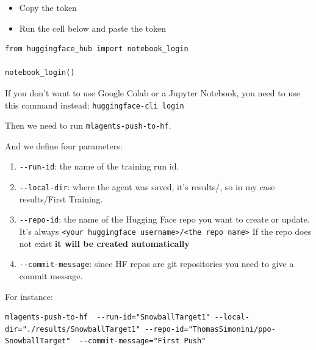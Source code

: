 \documentclass[11pt,a4paper]{article}
\begin{document}

\begin{itemize}
\tightlist
\item
  Copy the token
\item
  Run the cell below and paste the token
\end{itemize}

\begin{lstlisting}
from huggingface_hub import notebook_login

notebook_login()
\end{lstlisting}

If you don't want to use Google Colab or a Jupyter Notebook, you need to use this command instead: \texttt{huggingface-cli\ login}

Then we need to run \texttt{mlagents-push-to-hf}.

And we define four parameters:

\begin{enumerate}
\def\labelenumi{\arabic{enumi}.}
\item
  \texttt{-\/-run-id}: the name of the training run id.
\item
  \texttt{-\/-local-dir}: where the agent was saved, it's results/, so in my case results/First Training.
\item
  \texttt{-\/-repo-id}: the name of the Hugging Face repo you want to create or update. It's always \texttt{\textless{}your\ huggingface\ username\textgreater{}/\textless{}the\ repo\ name\textgreater{}} If the repo does not exist \textbf{it will be created automatically}
\item
  \texttt{-\/-commit-message}: since HF repos are git repositories you need to give a commit message.
\end{enumerate}


For instance:

\begin{lstlisting}
mlagents-push-to-hf  --run-id="SnowballTarget1" --local-dir="./results/SnowballTarget1" --repo-id="ThomasSimonini/ppo-SnowballTarget"  --commit-message="First Push"
\end{lstlisting}
\end{document}
